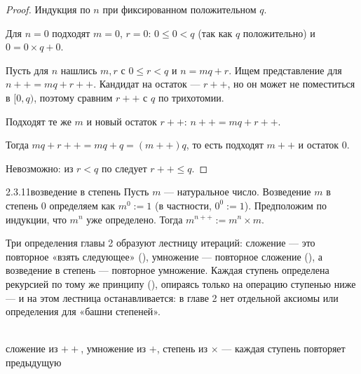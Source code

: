 \begin{proof}
Индукция по $n$ при фиксированном положительном $q$.

 Для $n=0$ подходят $m=0$, $r=0$: $0 \leq 0 < q$ (так как $q$
положительно) и $0 = 0 \times q + 0$.

 Пусть для $n$ нашлись $m,r$ с $0 \leq r < q$ и $n=mq+r$. Ищем
представление для $n{+}{+} = mq+r{+}{+}$. Кандидат на остаток — $r{+}{+}$, но он может не
поместиться в $[0,q)$, поэтому сравним $r{+}{+}$ с $q$ по трихотомии.

 Подходят те же $m$ и новый остаток $r{+}{+}$:
$n{+}{+} = mq+r{+}{+}$.

 Тогда $mq+r{+}{+} = mq+q = (m{+}{+})q$, то есть подходят $m{+}{+}$
и остаток $0$.

 Невозможно: из $r<q$ по  следует $r{+}{+} \leq q$.
\end{proof}

\begin{definition}{2.3.11}{возведение в степень}
Пусть $m$ — натуральное число. Возведение $m$ в степень $0$ определяем как $m^0 := 1$
(в частности, $0^0 := 1$). Предположим по индукции, что $m^n$ уже определено. Тогда
$m^{n{+}{+}} := m^n \times m$.
\end{definition}

\begin{intuition}
Три определения главы 2 образуют лестницу итераций: сложение — это повторное «взять
следующее» (), умножение — повторное сложение
(), а возведение в степень — повторное умножение.
Каждая ступень определена рекурсией по тому же принципу
(), опираясь только на операцию ступенью ниже — и
на этом лестница останавливается: в главе 2 нет отдельной аксиомы или определения для
«башни степеней».

\begin{center}
\\
{\footnotesize\color{intuitiongray}сложение из ${+}{+}$, умножение из $+$, степень из
$\times$ — каждая ступень повторяет предыдущую}
\end{center}
\end{intuition}

